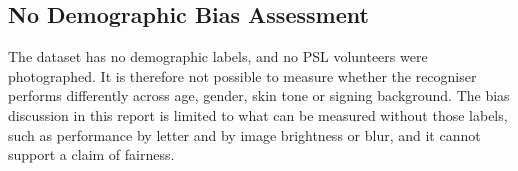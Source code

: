 \subsection{No Demographic Bias Assessment}

The dataset has no demographic labels, and no PSL volunteers were photographed. It is therefore not possible to measure whether the recogniser performs differently across age, gender, skin tone or signing background. The bias discussion in this report is limited to what can be measured without those labels, such as performance by letter and by image brightness or blur, and it cannot support a claim of fairness.
